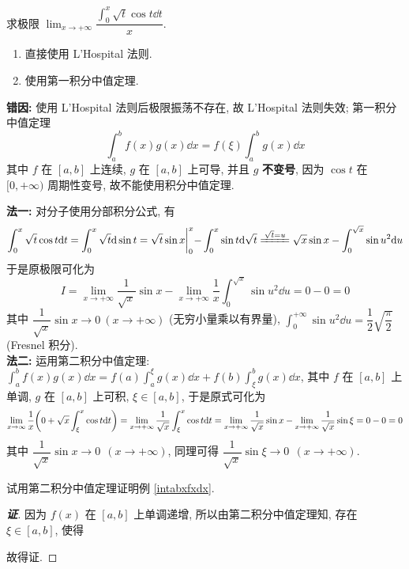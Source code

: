 \begin{example}
    求极限 $\displaystyle\lim_{x\to+\infty}\dfrac{\displaystyle\int_{0}^{x}\sqrt{t}\cos t\dd t}{x}.$
\end{example}
\begin{errorSolution}
    \begin{enumerate}[label=(\arabic{*})]
        \item 直接使用 L'Hospital 法则.
        \item 使用第一积分中值定理.
    \end{enumerate}
    \textbf{错因: }使用 L'Hospital 法则后极限振荡不存在, 故 L'Hospital 法则失效; 第一积分中值定理 $$\displaystyle\int_{a}^{b}f(x)g(x)\dd x=f(\xi)\int_{a}^{b}g(x)\dd x$$
    其中 $f$ 在 $[a,b]$ 上连续, $g$ 在 $[a,b]$ 上可导, 并且 $g$ \textbf{不变号}, 因为 $\cos t$ 在 $[0,+\infty)$ 周期性变号, 故不能使用积分中值定理.\\
\end{errorSolution}
\begin{solution}
    \textbf{法一: }对分子使用分部积分公式, 有
    $$\int_{0}^{x}\sqrt{t}\cos t\dd t=\int_{0}^{x}\sqrt{t}\dd \sin t=\sqrt{t}\sin x\biggl |_{0}^{x}-\int_{0}^{x}\sin t\dd \sqrt{t} \xlongequal{\sqrt{t}=u}\sqrt{x}\sin x-\int_{0}^{\sqrt{x}}\sin u^2\dd u$$
    于是原极限可化为 $$I=\lim_{x\to+\infty}\dfrac{1}{\sqrt{x}}\sin x-\lim_{x\to+\infty}\dfrac{1}{x}\int_{0}^{\sqrt{x}}\sin u^2\dd u=0-0=0$$
    其中 $\dfrac{1}{\sqrt{x}}\sin x\to0~(x\to+\infty)$ (无穷小量乘以有界量), $\displaystyle\int_{0}^{+\infty}\sin u^2\dd u=\dfrac{1}{2}\sqrt{\dfrac{\pi}{2}}$ (Fresnel 积分).\\
    \textbf{法二: }运用第二积分中值定理: $\displaystyle\int_{a}^{b}f(x)g(x)\dd x=f(a)\int_{a}^{\xi}g(x)\dd x+f(b)\int_{\xi}^{b}g(x)\dd x$, 其中 $f$ 在 $[a,b]$ 上单调, $g$ 在 $[a,b]$ 上可积, $\xi\in[a,b]$, 于是原式可化为
    $$\lim_{x\to\infty}\dfrac{1}{x}\qty(0+\sqrt{x}\int_{\xi}^{x}\cos t\dd t)=\lim_{x\to+\infty}\dfrac{1}{\sqrt{x}}\int_{\xi}^{x}\cos t\dd t=\lim_{x\to+\infty}\dfrac{1}{\sqrt{x}}\sin x-\lim_{x\to+\infty}\dfrac{1}{\sqrt{x}}\sin\xi=0-0=0$$
    其中 $\dfrac{1}{\sqrt{x}}\sin x\to0~~(x\to+\infty)$, 同理可得 $\dfrac{1}{\sqrt{x}}\sin\xi\to0~~(x\to+\infty)$.
\end{solution}

\begin{example}
    试用第二积分中值定理证明例 \ref{intabxfxdx}.
\end{example}
\begin{proof}[{\songti \textbf{证}}]
    因为 $f(x)$ 在 $[a,b]$ 上单调递增, 所以由第二积分中值定理知, 存在 $\xi\in[a,b]$, 使得
    故得证.
\end{proof}

